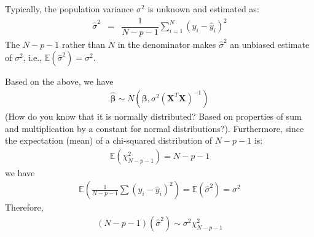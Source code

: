 \documentclass[11pt]{article}
\theoremstyle{remark}
\begin{document}
Typically, the population variance $\sigma^2$ is unknown and estimated as:
\begin{eqnarray}
\hat{\sigma}^2 &=& \dfrac{1}{N-p-1}\sum_{i=1}^N (y_i - \hat{y}_i)^2
\end{eqnarray}
The $N-p-1$ rather than $N$ in the denominator makes $\hat{\sigma}^2$ an unbiased estimate of $\sigma^2$, i.e., $\mathbb{E}(\hat{\sigma}^2) = \sigma^2$.

Based on the above, we have
\begin{eqnarray}
\boldsymbol{\hat{\beta}}\sim N(\boldsymbol{\beta},\sigma^2 \left(\mathbf{X}^T\mathbf{X}\right)^{-1})
\label{NormallyDistributedBetaHat}
\end{eqnarray}
(How do you know that it is normally distributed? Based on properties of sum and multiplication by a constant for normal distributions?). Furthermore, since the expectation (mean) of a chi-squared distribution of $N-p-1$ is:
\begin{eqnarray}
\mathbb{E}(\chi^2_{N-p-1})=N-p-1
\end{eqnarray}
we have
\begin{eqnarray}
\mathbb{E}\left(\frac{1}{N-p-1}\sum(y_i-\hat{y}_i)^2\right)= \mathbb{E}(\hat{\sigma}^2) = \sigma^2
\end{eqnarray}
Therefore,
\begin{eqnarray}
(N-p-1)(\hat{\sigma}^2) \sim \sigma^2\chi^2_{N-p-1}
\end{eqnarray}
\end{document}
